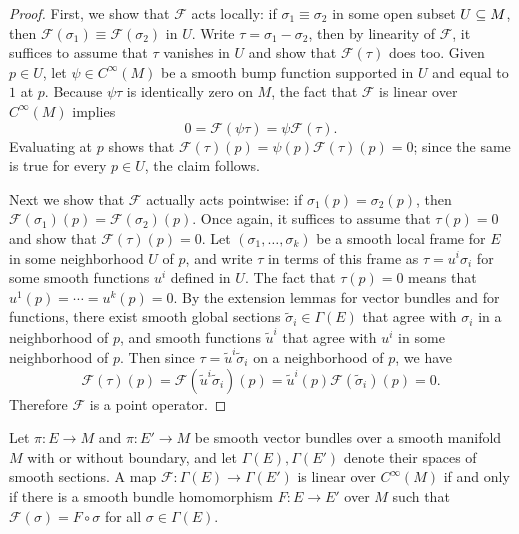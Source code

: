 \begin{proof}
First, we show that $\mathcal{F}$ acts locally: if $\sigma_1\equiv\sigma_2$ in some open subset $U\subseteq M$, then $\mathcal{F}(\sigma_1)\equiv\mathcal{F}(\sigma_2)$ in 
$U$. Write $\tau=\sigma_1-\sigma_2$, then by linearity of $\mathcal{F}$, it suffices to assume that $\tau$ vanishes in $U$ and show that $\mathcal{F}(\tau)$ does too. 
Given $p\in U$, let $\psi\in C^\infty(M)$ be a smooth bump function supported in $U$ and equal to $1$ at $p$. Because $\psi\tau$ is identically zero on $M$, the fact 
that $\mathcal{F}$ is linear over $C^\infty(M)$ implies
\[0=\mathcal{F}(\psi\tau)=\psi\mathcal{F}(\tau).\]
Evaluating at $p$ shows that $\mathcal{F}(\tau)(p)=\psi(p)\mathcal{F}(\tau)(p)=0$; since the same is true for every $p\in U$, the claim follows.\par
Next we show that $\mathcal{F}$ actually acts pointwise: if $\sigma_1(p)=\sigma_2(p)$, then $\mathcal{F}(\sigma_1)(p)=\mathcal{F}(\sigma_2)(p)$. Once again, it suffices 
to assume that $\tau(p)=0$ and show that $\mathcal{F}(\tau)(p)=0$. Let $(\sigma_1,\dots,\sigma_k)$ be a smooth local frame for $E$ in some neighborhood $U$ of $p$, and 
write $\tau$ in terms of this frame as $\tau=u^i\sigma_i$ for some smooth functions $u^i$ defined in $U$. The fact that $\tau(p)=0$ means that $u^1(p)=\cdots=u^k(p)=0$. 
By the extension lemmas for vector bundles and for functions, there exist smooth global sections $\widetilde{\sigma}_i\in\Gamma(E)$ that agree with $\sigma_i$ in a 
neighborhood of $p$, and smooth functions $\widetilde{u}^i$ that agree with $u^i$ in some neighborhood of $p$. Then since $\tau=\widetilde{u}^i\widetilde{\sigma}_i$ on 
a neighborhood of $p$, we have
\[\mathcal{F}(\tau)(p)=\mathcal{F}(\widetilde{u}^i\widetilde{\sigma}_i)(p)=\widetilde{u}^i(p)\mathcal{F}(\widetilde{\sigma}_i)(p)=0.\]
Therefore $\mathcal{F}$ is a point operator.
\end{proof}
\begin{lemma}\label{vector bundle homo char}
Let $\pi:E\to M$ and $\pi:E'\to M$ be smooth vector bundles over a smooth manifold $M$ with or without boundary, and let $\Gamma(E),\Gamma(E')$ denote their spaces of 
smooth sections. A map $\mathcal{F}:\Gamma(E)\to\Gamma(E')$ is linear over $C^\infty(M)$ if and only if there is a smooth bundle homomorphism $F:E\to E'$ over $M$ such 
that $\mathcal{F}(\sigma)=F\circ\sigma$ for all $\sigma\in\Gamma(E)$.
\end{lemma}
